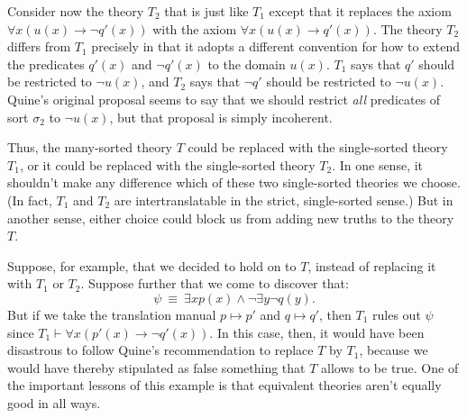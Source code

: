 \begin{example}
Consider now the theory $T_2$ that is just like $T_1$ except that it
replaces the axiom $\forall x(u(x)\to \neg q'(x))$ with the axiom
$\forall x(u(x)\to q'(x))$.  The theory $T_2$ differs from $T_1$
precisely in that it adopts a different convention for how to extend
the predicates $q'(x)$ and $\neg q'(x)$ to the domain $u(x)$.  $T_1$
says that $q'$ should be restricted to $\neg u(x)$, and $T_2$ says
that $\neg q'$ should be restricted to $\neg u(x)$.  Quine's original
proposal seems to say that we should restrict {\it all} predicates of
sort $\sigma _2$ to $\neg u(x)$, but that proposal is simply
incoherent.

Thus, the many-sorted theory $T$ could be replaced with the
single-sorted theory $T_1$, or it could be replaced with the
single-sorted theory $T_2$.  In one sense, it shouldn't make any
difference which of these two single-sorted theories we choose.  (In
fact, $T_1$ and $T_2$ are intertranslatable in the strict,
single-sorted sense.)  But in another sense, either choice could block
us from adding new truths to the theory $T$.

Suppose, for example, that we decided to hold on to $T$, instead of
replacing it with $T_1$ or $T_2$.  Suppose further that we come to
discover that:
\[ \psi \: \equiv \: \exists xp(x) \wedge \neg \exists y\neg q(y) .\]
But if we take the translation manual $p\mapsto p'$ and $q\mapsto q'$,
then $T_1$ rules out $\psi$ since
$T_1\vdash \forall x(p'(x)\to \neg q'(x))$.  In this case, then, it
would have been disastrous to follow Quine's recommendation to replace
$T$ by $T_1$, because we would have thereby stipulated as false
something that $T$ allows to be true.  One of the important lessons of
this example is that equivalent theories aren't equally good in all
ways.
\end{example}




  

